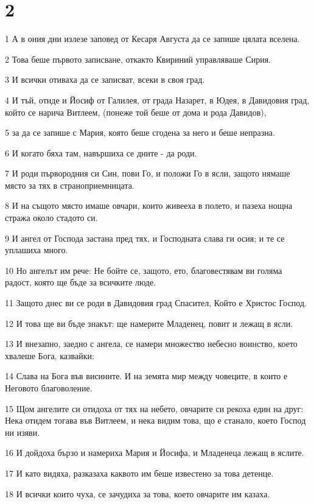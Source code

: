 \chapter{2}

\par 1 А в ония дни излезе заповед от Кесаря Августа да се запише цялата вселена.
\par 2 Това беше първото записване, откакто Квириний управляваше Сирия.
\par 3 И всички отиваха да се записват, всеки в своя град.
\par 4 И тъй, отиде и Йосиф от Галилея, от града Назарет, в Юдея, в Давидовия град, който се нарича Витлеем, (понеже той беше от дома и рода Давидов),
\par 5 за да се запише с Мария, която беше сгодена за него и беше непразна.
\par 6 И когато бяха там, навършиха се дните - да роди.
\par 7 И роди първородния си Син, пови Го, и положи Го в ясли, защото нямаше място за тях в страноприемницата.
\par 8 И на същото място имаше овчари, които живееха в полето, и пазеха нощна стража около стадото си.
\par 9 И ангел от Господа застана пред тях, и Господната слава ги осия; и те се уплашиха много.
\par 10 Но ангелът им рече: Не бойте се, защото, ето, благовестявам ви голяма радост, която ще бъде за всичките люде.
\par 11 Защото днес ви се роди в Давидовия град Спасител, Който е Христос Господ.
\par 12 И това ще ви бъде знакът: ще намерите Младенец, повит и лежащ в ясли.
\par 13 И внезапно, заедно с ангела, се намери множество небесно воинство, което хвалеше Бога, казвайки:
\par 14 Слава на Бога във висините. И на земята мир между човеците, в които е Неговото благоволение.
\par 15 Щом ангелите си отидоха от тях на небето, овчарите си рекоха един на друг: Нека отидем тогава във Витлеем, и нека видим това, що е станало, което Господ ни изяви.
\par 16 И дойдоха бързо и намериха Мария и Йосифа, и Младенеца лежащ в яслите.
\par 17 И като видяха, разказаха каквото им беше известено за това детенце.
\par 18 И всички които чуха, се зачудиха за това, което овчарите им казаха.
